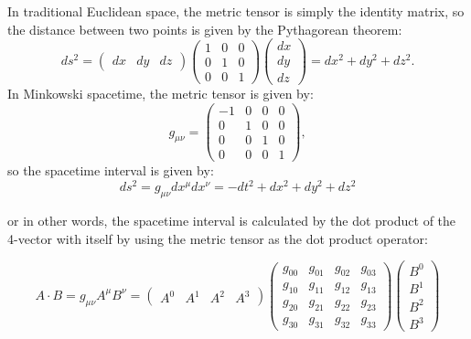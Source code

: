 \begin{theory}
  In traditional Euclidean space, the metric tensor is simply the identity matrix, so the distance between two points is given by the Pythagorean theorem:
  \[
    ds^2 = \begin{pmatrix}dx & dy & dz\end{pmatrix}
    \begin{pmatrix}1 & 0 & 0 \\
            0 & 1 & 0 \\
            0 & 0 & 1\end{pmatrix}
    \begin{pmatrix}dx \\ dy \\ dz\end{pmatrix}
    = dx^2 + dy^2 + dz^2.
  \]
  \smallskip\noindent
  In Minkowski spacetime, the metric tensor is given by:
  \[
    g_{\mu\nu} = \begin{pmatrix}-1 & 0 & 0 & 0 \\
            0 & 1 & 0 & 0 \\
            0 & 0 & 1 & 0 \\
            0 & 0 & 0 & 1\end{pmatrix},
  \]
  so the spacetime interval is given by:
  \[
    ds^2 = g_{\mu\nu} dx^\mu dx^\nu = -dt^2 + dx^2 + dy^2 + dz^2
  \]
\end{theory}

\bigskip\noindent
or in other words, the spacetime interval is calculated by the dot product of the 4-vector with itself by using the metric tensor as the dot product operator:
\begin{theory}
  \[
    A \cdot B = g_{\mu\nu} A^\mu B^\nu = \begin{pmatrix} A^0 & A^1 & A^2 & A^3 \end{pmatrix}
    \begin{pmatrix}
      g_{00} & g_{01} & g_{02} & g_{03} \\
      g_{10} & g_{11} & g_{12} & g_{13} \\
      g_{20} & g_{21} & g_{22} & g_{23} \\
      g_{30} & g_{31} & g_{32} & g_{33}
    \end{pmatrix}
    \begin{pmatrix} B^0 \\ B^1 \\ B^2 \\ B^3 \end{pmatrix}
  \]
\end{theory}


